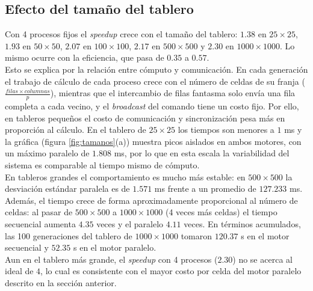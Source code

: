\documentclass{article}
\begin{document}
\subsection{Efecto del tamaño del tablero}
Con 4 procesos fijos el \textit{speedup} crece con el tamaño del tablero: $1.38$ en $25 \times 25$, $1.93$ en $50 \times 50$, $2.07$ en $100 \times 100$, $2.17$ en $500 \times 500$ y $2.30$ en $1000 \times 1000$. Lo mismo ocurre con la eficiencia, que pasa de $0.35$ a $0.57$.\\

Esto se explica por la relación entre cómputo y comunicación. En cada generación el trabajo de cálculo de cada proceso crece con el número de celdas de su franja ($\frac{filas \times columnas}{p}$), mientras que el intercambio de filas fantasma solo envía una fila completa a cada vecino, y el \textit{broadcast} del comando tiene un costo fijo. Por ello, en tableros pequeños el costo de comunicación y sincronización pesa más en proporción al cálculo. En el tablero de $25 \times 25$ los tiempos son menores a $1$ ms y la gráfica (figura \ref{fig:tamanos}(a)) muestra picos aislados en ambos motores, con un máximo paralelo de $1.808$ ms, por lo que en esta escala la variabilidad del sistema es comparable al tiempo mismo de cómputo.\\

En tableros grandes el comportamiento es mucho más estable: en $500 \times 500$ la desviación estándar paralela es de $1.571$ ms frente a un promedio de $127.233$ ms. Además, el tiempo crece de forma aproximadamente proporcional al número de celdas: al pasar de $500 \times 500$ a $1000 \times 1000$ (4 veces más celdas) el tiempo secuencial aumenta $4.35$ veces y el paralelo $4.11$ veces. En términos acumulados, las 100 generaciones del tablero de $1000 \times 1000$ tomaron $120.37$ s en el motor secuencial y $52.35$ s en el motor paralelo.\\

Aun en el tablero más grande, el \textit{speedup} con 4 procesos ($2.30$) no se acerca al ideal de $4$, lo cual es consistente con el mayor costo por celda del motor paralelo descrito en la sección anterior.
\end{document}
